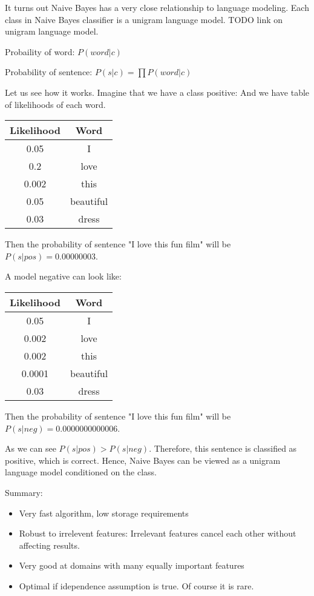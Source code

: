 \documentclass[12pt]{report}
\begin{document}
It turns out Naive Bayes has a very close relationship to language modeling.
Each class in Naive Bayes classifier is a unigram language model. TODO link on unigram language model.

Probaility of word: $P(word | c)$

Probability of sentence: $P(s | c) = \prod{}{P(word | c)}$

Let us see how it works. Imagine that we have a class positive:
And we have table of likelihoods of each word.

\begin{center}
  \begin{tabular}{ c | c }
    \hline
    Likelihood & Word \\ \hline
    0.05 & I \\ \hline
    0.2 & love \\ \hline
    0.002 & this \\ \hline
    0.05 & beautiful \\ \hline
    0.03 & dress \\ \hline
  \end{tabular}
\end{center}

Then the probability of sentence "I love this fun film" will be $P(s | pos) = 0.00000003$.

A model negative can look like:

\begin{center}
  \begin{tabular}{ c | c }
    \hline
    Likelihood & Word \\ \hline
    0.05 & I \\ \hline
    0.002 & love \\ \hline
    0.002 & this \\ \hline
    0.0001 & beautiful \\ \hline
    0.03 & dress \\ \hline
  \end{tabular}
\end{center}

Then the probability of sentence "I love this fun film" will be $P(s | neg) = 0.0000000000006$.

As we can see $P(s | pos) > P(s | neg)$. Therefore, this sentence is classified as positive, which is correct.
Hence, Naive Bayes can be viewed as a unigram language model conditioned on the class.


Summary:
\begin{itemize}
  \item Very fast algorithm, low storage requirements
  \item Robust to irrelevent features: Irrelevant features cancel each other without affecting results.
  \item Very good at domains with many equally important features
  \item Optimal if idependence assumption is true. Of course it is rare.
\end{itemize}
\end{document}
